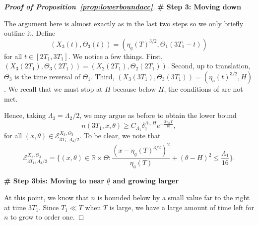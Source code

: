 \documentclass[11pt]{article}    %
\newcommand{\R}{\mathbb{R}}
\begin{document}
\begin{proof}[{\bf Proof of Proposition~\ref{prop:lowerboundacc}}]
\smallskip

{\bf \# Step 3: Moving down}

\smallskip

The argument here is almost exactly as in the last two steps so we only briefly outline it.  Define
\[
	(X_3(t), \Theta_3(t)) = (\eta_{\underline a}(T)^{3/2}, \Theta_1(3T_1 - t))
\]
for all $t\in[2T_1, 3T_1]$.  We notice a few things.  First, $(X_3(2T_1),\Theta_3(2T_1)) = (X_2(2T_1),\Theta_2(2T_1))$.  Second, up to translation, $\Theta_3$ is the time reversal of $\Theta_1$.  Third, $(X_3(3T_1), \Theta_3(3T_1)) = (\eta_{\underline a}(t)^{3/2}, H)$.  We recall that we must stop at $H$ because below $H$, the conditions of  are not met.

Hence, taking $\Lambda_3 = \Lambda_2/2$, we may argue as before to obtain the lower bound
\[
	n(3T_1,x,\theta) \geq C_{\Lambda_1} \delta_1^{\Lambda_1,H} e^{- \frac{3\gamma_\infty T}{10}},
\]
for all $(x,\theta) \in \mathcal{E}_{3T_1,\Lambda_3/2}^{X_3,\Theta_3}$.  To be clear, we note that 
\[
	 \mathcal{E}_{3T_1,\Lambda_3/2}^{X_3,\Theta_3}
		= \Big\{(x,\theta) \in \R\times\Theta: \frac{(x - \eta_{\underline a}(T)^{3/2})^2}{\eta_{\underline a}(T)} + (\theta - H)^2 \leq \frac{\Lambda_1}{16}
		\Big\}.
\]


\smallskip

{\bf \# Step 3bis: Moving to near $\underline \theta$ and growing larger}

\smallskip


At this point, we know that $n$ is bounded below by a small value far to the right at time $3T_1$.  Since $T_1 \ll T$ when $T$ is large, we have a large amount of time left for $n$ to grow to order one.


\end{proof}
\end{document}
